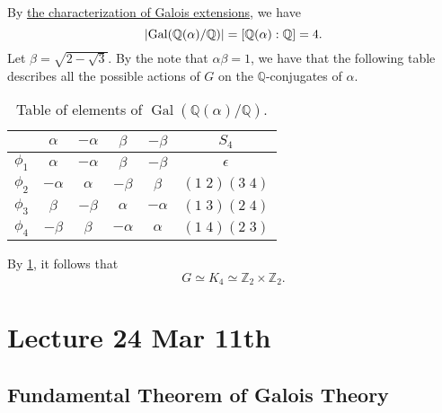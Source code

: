 \documentclass[notoc,notitlepage,nobib]{tufte-book}
\DeclareMathOperator{\Gal}{Gal}
\begin{document}
\begin{eg}
  By \hyperref[thm:characterization_of_galois_extensions]{the characterization
  of Galois extensions}, we have
  \begin{equation*}
    \abs{\Gal(\mathbb{Q}(\alpha)/\mathbb{Q})} = [\mathbb{Q}(\alpha) :
    \mathbb{Q}] = 4.
  \end{equation*}
  Let $\beta = \sqrt{2 - \sqrt{3}}$. By the note that $\alpha \beta = 1$, we
  have that the following table describes all the possible actions of $G$ on the
  $\mathbb{Q}$-conjugates of $\alpha$.
  \begin{table}[ht]
    \centering
    \caption{Table of elements of $\Gal(\mathbb{Q}(\alpha)/\mathbb{Q})$.}
    \label{table:table_of_elements_of_gal_q_alpha_q}
    \begin{tabular}{c | c c c c | c}
               & $\alpha$  & $-\alpha$ & $\beta$   & $-\beta$  & $S_4$ \\
      \hline
      $\phi_1$ & $\alpha$  & $-\alpha$ & $\beta$   & $-\beta$  & $\epsilon$ \\
      $\phi_2$ & $-\alpha$ & $\alpha$  & $-\beta$  & $\beta$   & $(1 \; 2)(3 \; 4)$ \\
      $\phi_3$ & $\beta$   & $-\beta$  & $\alpha$  & $-\alpha$ & $(1 \; 3)(2 \; 4)$ \\
      $\phi_4$ & $-\beta$  & $\beta$   & $-\alpha$ & $\alpha$  & $(1 \; 4)(2 \; 3)$
    \end{tabular}
  \end{table}

  By \cref{table:table_of_elements_of_gal_q_alpha_q}, it follows that
  \begin{equation*}
    G \simeq K_4 \simeq \mathbb{Z}_2 \times \mathbb{Z}_2.
  \end{equation*}
\end{eg}



\chapter{Lecture 24 Mar 11th}%
\label{chp:lecture_24_mar_11th}

\section{Fundamental Theorem of Galois Theory}%
\label{sec:fundamental_theorem_of_galois_theory}
\end{document}
